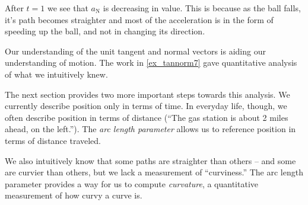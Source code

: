 {After $t=1$ we see that $a_\text{N}$ is decreasing in value. This is because as the ball falls, it's path becomes straighter and most of the acceleration is in the form of speeding up the ball, and not in changing its direction.
}

Our understanding of the unit tangent and normal vectors is aiding our understanding of motion. The work in \autoref{ex_tannorm7} gave quantitative analysis of what we intuitively knew.

The next section provides two more important steps towards this analysis. %
We currently describe position only in terms of time. In everyday life, though, we often describe position in terms of distance (``The gas station is about 2 miles ahead, on the left.''). The \emph{arc length parameter} allows us to reference position in terms of distance traveled. 

We also intuitively know that some paths are straighter than others -- and some are curvier than others, but we lack a measurement of ``curviness.'' The arc length parameter provides a way for us to compute \emph{curvature}, a quantitative measurement of how curvy a curve is.

